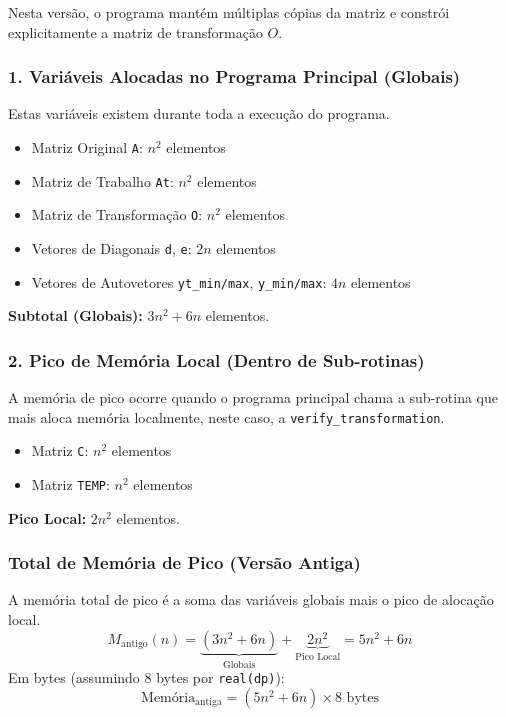 \documentclass[12pt, a4paper]{article} %
\begin{document}
            Nesta vers\~ao, o programa mant\'em m\'ultiplas c\'opias da matriz e constr\'oi explicitamente a matriz de transforma\c{c}\~ao $O$.

            \subsubsection*{1. Vari\'aveis Alocadas no Programa Principal (Globais)}
            Estas vari\'aveis existem durante toda a execu\c{c}\~ao do programa.
            \begin{itemize}
                \item Matriz Original \texttt{A}: $n^2$ elementos
                \item Matriz de Trabalho \texttt{At}: $n^2$ elementos
                \item Matriz de Transforma\c{c}\~ao \texttt{O}: $n^2$ elementos
                \item Vetores de Diagonais \texttt{d}, \texttt{e}: $2n$ elementos
                \item Vetores de Autovetores \texttt{yt\_min/max}, \texttt{y\_min/max}: $4n$ elementos
            \end{itemize}
            \textbf{Subtotal (Globais):} $3n^2 + 6n$ elementos.

            \subsubsection*{2. Pico de Mem\'oria Local (Dentro de Sub-rotinas)}
            A mem\'oria de pico ocorre quando o programa principal chama a sub-rotina que mais aloca mem\'oria localmente, neste caso, a \texttt{verify\_transformation}.
            \begin{itemize}
                \item Matriz \texttt{C}: $n^2$ elementos
                \item Matriz \texttt{TEMP}: $n^2$ elementos
            \end{itemize}
            \textbf{Pico Local:} $2n^2$ elementos.

            \subsubsection*{Total de Mem\'oria de Pico (Vers\~ao Antiga)}
            A mem\'oria total de pico \'e a soma das vari\'aveis globais mais o pico de aloca\c{c}\~ao local.
            \[
            M_{\text{antigo}}(n) = \underbrace{(3n^2 + 6n)}_{\text{Globais}} + \underbrace{2n^2}_{\text{Pico Local}} = 5n^2 + 6n
            \]
            Em bytes (assumindo 8 bytes por \texttt{real(dp)}):
            \[
            \text{Mem\'oria}_{\text{antiga}} = (5n^2 + 6n) \times 8 \text{ bytes}
            \]
\end{document}

